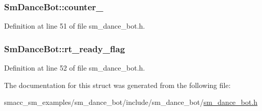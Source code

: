 \subsubsection[{\texorpdfstring{counter\+\_\+1}{counter_1}}]{ Sm\+Dance\+Bot\+::counter\+\_}\hypertarget{structSmDanceBot_a9125df831508b9d16e747993c546f771}{}\label{structSmDanceBot_a9125df831508b9d16e747993c546f771}


Definition at line 51 of file sm\+\_\+dance\+\_\+bot.\+h.

\subsubsection[{\texorpdfstring{rt\+\_\+ready\+\_\+flag}{rt_ready_flag}}]{ Sm\+Dance\+Bot\+::rt\+\_\+ready\+\_\+flag}\hypertarget{structSmDanceBot_a4943f893a4f3184a78cf379b143cc7ed}{}\label{structSmDanceBot_a4943f893a4f3184a78cf379b143cc7ed}


Definition at line 52 of file sm\+\_\+dance\+\_\+bot.\+h.



The documentation for this struct was generated from the following file\+:\begin{DoxyCompactItemize}
\item 
smacc\+\_\+sm\+\_\+examples/sm\+\_\+dance\+\_\+bot/include/sm\+\_\+dance\+\_\+bot/\hyperlink{sm__dance__bot_8h}{sm\+\_\+dance\+\_\+bot.\+h}\end{DoxyCompactItemize}
